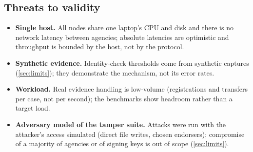 \subsection{Threats to validity}
\begin{itemize}[nosep]
  \item \textbf{Single host.} All nodes share one laptop's CPU and disk and there is no network latency between agencies; absolute latencies are optimistic and throughput is bounded by the host, not by the protocol.
  \item \textbf{Synthetic evidence.} Identity-check thresholds come from synthetic captures (\cref{sec:limits}); they demonstrate the mechanism, not its error rates.
  \item \textbf{Workload.} Real evidence handling is low-volume (registrations and transfers per case, not per second); the benchmarks show headroom rather than a target load.
  \item \textbf{Adversary model of the tamper suite.} Attacks were run with the attacker's access simulated (direct file writes, chosen endorsers); compromise of a majority of agencies or of signing keys is out of scope (\cref{sec:limits}).
\end{itemize}
